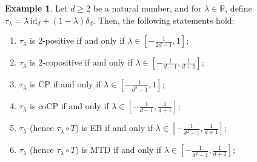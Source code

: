 \documentclass[11pt,reqno]{amsart}
\theoremstyle{definition}
\newtheorem{eg}[defn]{Example}
\theoremstyle{plain}
\theoremstyle{remark}
\numberwithin{equation}{section}%
\begin{document}
  \begin{eg}\label{example in appendix}
  	Let $d\geq 2$ be a natural number, and for $\lambda\in\mathbb{R}$, define $\tau_\lambda=\lambda\,\text{id}_d+(1-\lambda)\delta_d$. Then, the following statements hold:
  	\begin{enumerate}
  		\item $\tau_\lambda$ is $2$-positive if and only if $\lambda\in\left[-\frac{1}{2d-1},1\right]$;
  		\item $\tau_\lambda$ is $2$-copositive if and only if $\lambda\in\left[-\frac{1}{d-1},\frac{1}{d+1}\right]$;
  		\item $\tau_\lambda$ is CP if and only if $\lambda\in \left[-\frac{1}{d^2-1},1\right]$;
  		\item $\tau_\lambda$ is coCP if and only if $\lambda\in\left[-\frac{1}{d-1},\frac{1}{d+1}\right]$;
  		\item $\tau_\lambda$ (hence $\tau_\lambda\circ T$) is EB if and only if $\lambda\in\left[-\frac{1}{d^2-1},\frac{1}{d+1}\right]$;
  		\item $\tau_\lambda$ (hence $\tau_\lambda\circ T$) is MTD if and only if $\lambda\in\left[-\frac{1}{d^2-1},\frac{1}{d+1}\right]$;
  	\end{enumerate}
  \end{eg}
  
\end{document}
